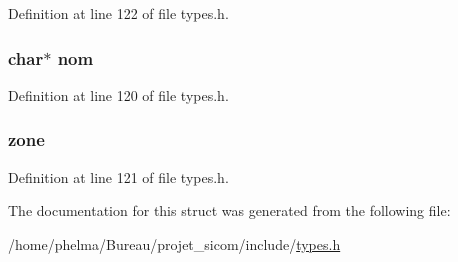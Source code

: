 Definition at line 122 of file types.\-h.

\hypertarget{struct__symb___abe308d273ff51ad86ff02ef3ba3b6f0e}{
\subsubsection[{nom}]{\setlength{\rightskip}{0pt plus 5cm}char$\ast$ nom}}\label{struct__symb___abe308d273ff51ad86ff02ef3ba3b6f0e}


Definition at line 120 of file types.\-h.

\hypertarget{struct__symb___a6a70ab3aecc26de50260bd4e04c43c9b}{
\subsubsection[{zone}]{ zone}}\label{struct__symb___a6a70ab3aecc26de50260bd4e04c43c9b}


Definition at line 121 of file types.\-h.



The documentation for this struct was generated from the following file\-:\begin{DoxyCompactItemize}
\item 
/home/phelma/\-Bureau/projet\-\_\-sicom/include/\hyperlink{types_8h}{types.\-h}\end{DoxyCompactItemize}
